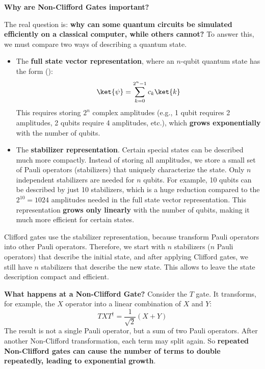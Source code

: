 \highspace
\begin{flushleft}
    \textcolor{Green3}{ \textbf{Why are Non-Clifford Gates important?}}
\end{flushleft}
The real question is: \textbf{why can some quantum circuits be simulated efficiently on a classical computer, while others cannot?} To answer this, we must compare two ways of describing a quantum state.
\begin{itemize}
    \item The \textbf{full state vector representation}, where an $n$-qubit quantum state has the form ():
    \begin{equation*}
        \ket{\psi} = \sum_{k=0}^{2^n-1} c_k \ket{k}
    \end{equation*}
    This requires storing $2^n$ complex amplitudes (e.g., 1 qubit requires 2 amplitudes, 2 qubits require 4 amplitudes, etc.), which \textbf{grows exponentially} with the number of qubits.

    \item The \textbf{stabilizer representation}. Certain special states can be described much more compactly. Instead of storing all amplitudes, we store a small set of Pauli operators (stabilizers) that uniquely characterize the state. Only $n$ independent stabilizers are needed for $n$ qubits. For example, 10 qubits can be described by just 10 stabilizers, which is a huge reduction compared to the $2^{10} = 1024$ amplitudes needed in the full state vector representation. This representation \textbf{grows only linearly} with the number of qubits, making it much more efficient for certain states.
\end{itemize}
Clifford gates use the stabilizer representation, because transform Pauli operators into other Pauli operators. Therefore, we start with $n$ stabilizers ($n$ Pauli operators) that describe the initial state, and after applying Clifford gates, we still have $n$ stabilizers that describe the new state. This allows to leave the state description compact and efficient.

\highspace
\textcolor{Green3}{ \textbf{What happens at a Non-Clifford Gate?}} Consider the $T$ gate. It transforms, for example, the $X$ operator into a linear combination of $X$ and $Y$:
\begin{equation*}
    T X T^\dagger =
    \frac{1}{\sqrt{2}} (X + Y)
\end{equation*}
The result is not a single Pauli operator, but a sum of two Pauli operators. After another Non-Clifford transformation, each term may split again. So \textbf{repeated Non-Clifford gates can cause the number of terms to double repeatedly, leading to exponential growth}.

